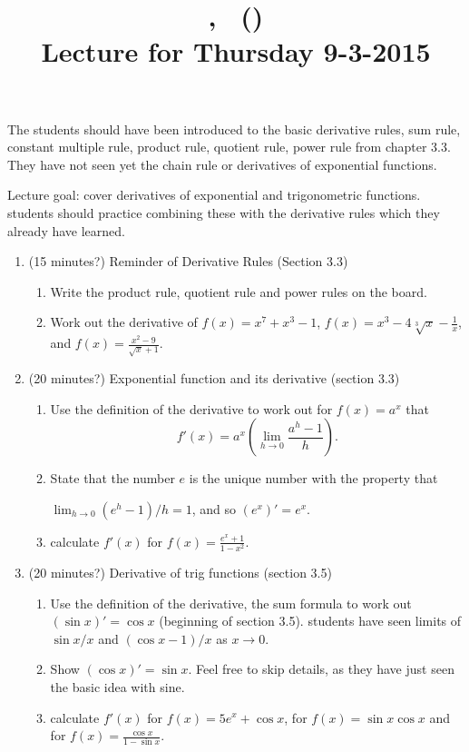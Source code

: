 \documentclass[12pt]{amsart}
\title{\course, \semester\ (\instructor) \\ Lecture for Thursday 9-3-2015}
\begin{document}
\maketitle
{\color{blue}The students should have been introduced to the basic
derivative rules, sum rule, constant multiple rule, product rule, quotient
rule, power rule from chapter 3.3. They have not seen yet the chain rule or
derivatives of exponential functions.}

Lecture goal: cover derivatives of exponential and trigonometric functions.
students should practice combining these with the derivative rules which
they already have learned.

\begin{enumerate}[1. ]
\setlength{\itemsep}{.3cm}
\item (15 minutes?)
Reminder of Derivative Rules (Section 3.3)
\begin{enumerate}[ i. ]
\item
Write the product rule, quotient rule and power rules on the board.
\item
Work out the derivative of $f(x) = x^7 + x^3 - 1$, $f(x) = x^3 - 4 \sqrt[3]
x - \frac 1x$, and $\displaystyle f(x) = \frac{x^2 - 9}{\sqrt x + 1}$.
\end{enumerate}

\item (20 minutes?)
Exponential function and its derivative (section 3.3)
\begin{enumerate}[ i. ]
\item
Use the definition of the derivative to work out for $f(x) = a^x$ that
$$\displaystyle f'(x) = a^x \left(\lim_{h \to 0} \frac{a^h -
1}{h}\right).$$
\item
State that the number $e$ is the unique number with the property that

$\lim_{h \to 0} (e^h - 1)/h = 1$, and so $(e^x)' = e^x$.
\item
calculate $f'(x)$ for $f(x) = \frac{e^x + 1}{1 - x^2}$.
\end{enumerate}

\item (20 minutes?)
Derivative of trig functions (section 3.5)
\begin{enumerate}[ i. ]
\item
Use the definition of the derivative, the sum formula to work out $(\sin x)'
= \cos x$ (beginning of section 3.5). students have seen limits of $\sin x
/ x$ and $(\cos x - 1)/x$ as $x \to 0$. 
\item
Show $(\cos x)' = \sin x$. Feel free to skip details, as they have just
seen the basic idea with sine.
\item
calculate $f'(x)$ for $f(x) = 5 e^x + \cos x$, for $f(x) = \sin x \cos x$
and for $\displaystyle f(x) = \frac{\cos x}{1 - \sin x}$. 
\end{enumerate}


\end{enumerate}
\end{document}
